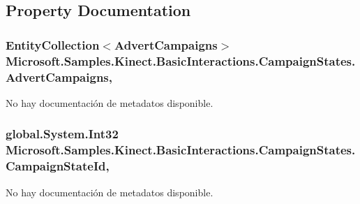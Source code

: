 \subsection{Property Documentation}
\hypertarget{class_microsoft_1_1_samples_1_1_kinect_1_1_basic_interactions_1_1_campaign_states_aa5ee6382ca7fef077e955b486374ddb4}{
\subsubsection[{Advert\-Campaigns}]{\setlength{\rightskip}{0pt plus 5cm}Entity\-Collection$<${\bf Advert\-Campaigns}$>$ Microsoft.\-Samples.\-Kinect.\-Basic\-Interactions.\-Campaign\-States.\-Advert\-Campaigns\hspace{0.3cm}{\ttfamily [get]}, {\ttfamily [set]}}}\label{class_microsoft_1_1_samples_1_1_kinect_1_1_basic_interactions_1_1_campaign_states_aa5ee6382ca7fef077e955b486374ddb4}


No hay documentación de metadatos disponible. 

\hypertarget{class_microsoft_1_1_samples_1_1_kinect_1_1_basic_interactions_1_1_campaign_states_a70e6151ff27f5191123c0e45e37a8b19}{
\subsubsection[{Campaign\-State\-Id}]{\setlength{\rightskip}{0pt plus 5cm}global.\-System.\-Int32 Microsoft.\-Samples.\-Kinect.\-Basic\-Interactions.\-Campaign\-States.\-Campaign\-State\-Id\hspace{0.3cm}{\ttfamily [get]}, {\ttfamily [set]}}}\label{class_microsoft_1_1_samples_1_1_kinect_1_1_basic_interactions_1_1_campaign_states_a70e6151ff27f5191123c0e45e37a8b19}


No hay documentación de metadatos disponible. 

